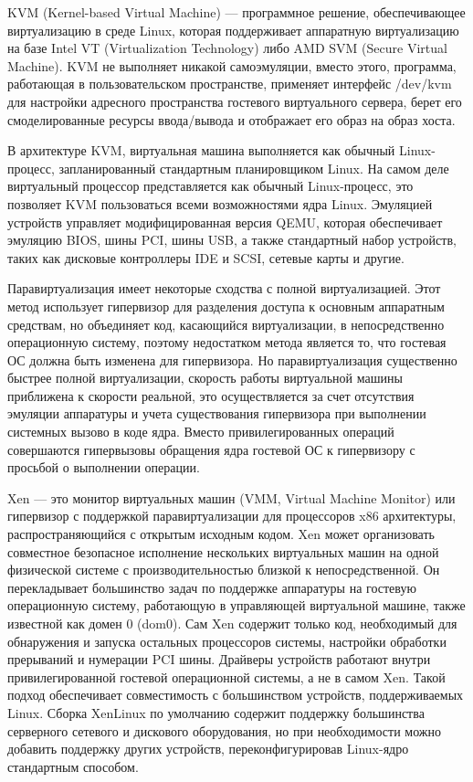 KVM (Kernel-based Virtual Machine) --- программное решение, обеспечивающее виртуализацию в среде Linux, которая поддерживает аппаратную виртуализацию на базе Intel VT (Virtualization Technology) либо AMD SVM (Secure Virtual Machine).
KVM не выполняет никакой самоэмуляции, вместо этого, программа, работающая в пользовательском пространстве, применяет интерфейс /dev/kvm для настройки адресного пространства гостевого виртуального сервера, берет его смоделированные ресурсы ввода/вывода и отображает его образ на образ хоста.

В архитектуре KVM, виртуальная машина выполняется как обычный Linux-процесс, запланированный стандартным планировщиком Linux.
На самом деле виртуальный процессор представляется как обычный Linux-процесс, это позволяет KVM пользоваться всеми возможностями ядра Linux.
Эмуляцией устройств управляет модифицированная версия QEMU, которая обеспечивает эмуляцию BIOS, шины PCI, шины USB, а также стандартный набор устройств, таких как дисковые контроллеры IDE и SCSI, сетевые карты и другие.

Паравиртуализация имеет некоторые сходства с полной виртуализацией.
Этот метод использует гипервизор для разделения доступа к основным аппаратным средствам, но объединяет код, касающийся виртуализации, в непосредственно операционную систему, поэтому недостатком метода является то, что гостевая ОС должна быть изменена для гипервизора.
Но паравиртуализация существенно быстрее полной виртуализации, скорость работы виртуальной машины приближена к скорости реальной, это осуществляется за счет отсутствия эмуляции аппаратуры и учета существования гипервизора при выполнении системных вызово в коде ядра.
Вместо привилегированных операций совершаются гипервызовы обращения ядра гостевой ОС к гипервизору с просьбой о выполнении операции.

Xen --- это монитор виртуальных машин (VMM, Virtual Machine Monitor) или гипервизор с поддержкой паравиртуализации для процессоров x86 архитектуры, распространяющийся с открытым исходным кодом.
Xen может организовать совместное безопасное исполнение нескольких виртуальных машин на одной физической системе с производительностью близкой к непосредственной.
Он перекладывает большинство задач по поддержке аппаратуры на гостевую операционную систему, работающую в управляющей виртуальной машине, также известной как домен 0 (dom0).
Сам Xen содержит только код, необходимый для обнаружения и запуска остальных процессоров системы, настройки обработки прерываний и нумерации PCI шины.
Драйверы устройств работают внутри привилегированной гостевой операционной системы, а не в самом Xen.
Такой подход обеспечивает совместимость с большинством устройств, поддерживаемых Linux.
Сборка XenLinux по умолчанию содержит поддержку большинства серверного сетевого и дискового оборудования, но при необходимости можно добавить поддержку других устройств, переконфигурировав Linux-ядро стандартным способом.

